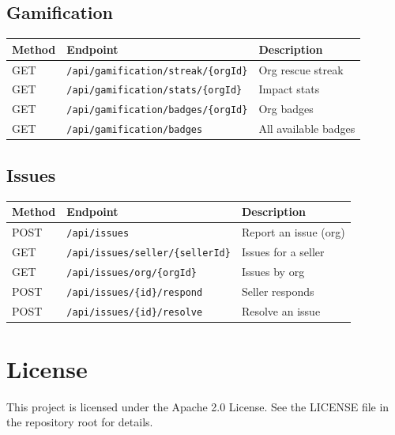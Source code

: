 \documentclass[a4paper,11pt]{article}
\begin{document}
\subsection{Gamification}

\begin{tabular}{l l l}
\toprule
Method & Endpoint & Description \\
\midrule
GET & \texttt{/api/gamification/streak/\{orgId\}} & Org rescue streak \\
GET & \texttt{/api/gamification/stats/\{orgId\}} & Impact stats \\
GET & \texttt{/api/gamification/badges/\{orgId\}} & Org badges \\
GET & \texttt{/api/gamification/badges} & All available badges \\
\bottomrule
\end{tabular}

\subsection{Issues}

\begin{tabular}{l l l}
\toprule
Method & Endpoint & Description \\
\midrule
POST & \texttt{/api/issues} & Report an issue (org) \\
GET & \texttt{/api/issues/seller/\{sellerId\}} & Issues for a seller \\
GET & \texttt{/api/issues/org/\{orgId\}} & Issues by org \\
POST & \texttt{/api/issues/\{id\}/respond} & Seller responds \\
POST & \texttt{/api/issues/\{id\}/resolve} & Resolve an issue \\
\bottomrule
\end{tabular}

\section{License}

This project is licensed under the Apache 2.0 License. See the LICENSE file in the repository root for details.
\end{document}
